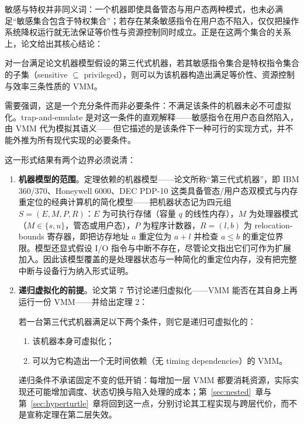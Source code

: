 敏感与特权并非同义词：一个机器即使具备管态与用户态两种模式，也未必满足“敏感集合包含于特权集合”；若存在某条敏感指令在用户态不陷入，仅仅把操作系统降权运行就无法保证等价性与资源控制同时成立。正是在这两个集合的关系上，论文给出其核心结论：

\begin{theorem}\label{thm:pg1}
对一台满足论文机器模型假设的第三代式机器，若其敏感指令集合是特权指令集合的子集（sensitive $\subseteq$ privileged），则可以为该机器构造出满足等价性、资源控制与效率三条性质的 VMM。
\end{theorem}

需要强调，这是一个充分条件而非必要条件：不满足该条件的机器未必不可虚拟化。trap-and-emulate 是对这一条件的直观解释——敏感指令在用户态自然陷入，由 VMM 代为模拟其语义——但它描述的是该条件下一种可行的实现方式，并不能外推为所有现代实现的必要条件。

这一形式结果有两个边界必须说清：

\begin{enumerate}[label=\arabic*.,leftmargin=2.5em,itemsep=2pt]
\item \textbf{机器模型的范围}。定理依赖的机器模型——论文所称“第三代式机器”，即 IBM 360/370、Honeywell 6000、DEC PDP-10 这类具备管态/用户态双模式与内存重定位的经典计算机的简化模型——把机器状态记为四元组 $S = (E, M, P, R)$：$E$ 为可执行存储（容量 $q$ 的线性内存），$M$ 为处理器模式（$M \in \{s, u\}$，管态或用户态），$P$ 为程序计数器，$R = (l, b)$ 为 relocation-bounds 寄存器，即把访存地址 $a$ 重定位为 $a + l$ 并检查 $a \le b$ 的重定位界限。模型还显式假设 I/O 指令与中断不存在，尽管论文指出它们可作为扩展加入\cite[§2]{source1}。因此该模型覆盖的是处理器状态与一种简化的重定位内存，没有把完整中断与设备行为纳入形式证明。
\item \textbf{递归虚拟化的前提}。论文第 7 节讨论递归虚拟化——VMM 能否在其自身上再运行一份 VMM——并给出定理 2：
\begin{theorem}\label{thm:pg2}
若一台第三代式机器满足以下两个条件，则它是递归可虚拟化的：
\begin{enumerate}[label=(\alph*),leftmargin=2.5em,itemsep=1pt]
\item 该机器本身可虚拟化；
\item 可以为它构造出一个无时间依赖（无 timing dependencies）的 VMM。
\end{enumerate}
\end{theorem}
递归条件不承诺固定不变的低开销：每增加一层 VMM 都要消耗资源，实际实现还可能增加调度、状态切换与陷入处理的成本；第~\ref{sec:nested}~章与第~\ref{sec:hyperturtle}~章将回到这一点，分别讨论其工程实现与跨层代价，而不是宣称定理在第二层失效。
\end{enumerate}

